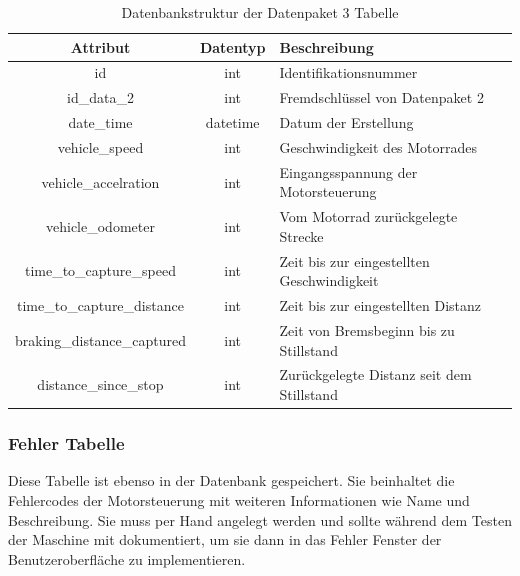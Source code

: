 \begin{table}[H]
	\begin{center}
		\begin{tabular}{|c|c|l|}
			\hline
			\textbf{Attribut}           & \textbf{Datentyp} & \textbf{Beschreibung}                     	\\ \hline
			id                          & int               & Identifikationsnummer                     	\\ \hline
			id\_data\_2                 & int               & Fremdschlüssel von Datenpaket 2          		\\ \hline
			date\_time                  & datetime          & Datum der Erstellung                      	\\ \hline
			vehicle\_speed              & int               & Geschwindigkeit des Motorrades            	\\ \hline
			vehicle\_accelration        & int               & Eingangsspannung der Motorsteuerung       	\\ \hline
			vehicle\_odometer           & int               & Vom Motorrad zurückgelegte Strecke        	\\ \hline
			time\_to\_capture\_speed    & int               & Zeit bis zur eingestellten Geschwindigkeit 	\\ \hline
			time\_to\_capture\_distance & int               & Zeit bis zur eingestellten Distanz        	\\ \hline
			braking\_distance\_captured & int               & Zeit von Bremsbeginn bis zu Stillstand     	\\ \hline
			distance\_since\_stop       & int               & Zurückgelegte Distanz seit dem Stillstand	 	\\ \hline
		\end{tabular}
		\caption{Datenbankstruktur der Datenpaket 3 Tabelle}
		\label{tab:data3}
	\end{center}
\end{table}



\newpage

\subsubsection{Fehler Tabelle} \label{sec:error_dis}

Diese Tabelle ist ebenso in der Datenbank gespeichert. Sie beinhaltet die Fehlercodes der Motorsteuerung mit weiteren Informationen wie Name und Beschreibung. Sie muss per Hand angelegt werden und sollte während dem Testen der Maschine mit dokumentiert, um sie dann in das Fehler Fenster der Benutzeroberfläche zu implementieren.

